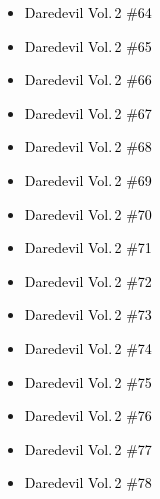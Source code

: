 \documentclass[12pt]{article}
\newcommand{\checkbox}{\raisebox{0.0ex}{\fbox{\rule{0ex}{1.5ex} \rule{1.5ex}{0ex}}}}
\begin{document}
\vspace{0.3cm}
\noindent
\begin{tcolorbox}[
  colback=white!95!gray,
  colframe=black,
  width=\textwidth,
  arc=4mm,
  auto outer arc,
  boxrule=0.8pt,
  left=8pt,right=8pt,top=8pt,bottom=8pt
]
\begin{itemize}[left=0pt,label={\checkbox}]
    \item \textcolor{black}{Daredevil Vol.\,2 \#64}
    \item \textcolor{black}{Daredevil Vol.\,2 \#65}
    \item \textcolor{black}{Daredevil Vol.\,2 \#66}
    \item \textcolor{black}{Daredevil Vol.\,2 \#67}
    \item \textcolor{black}{Daredevil Vol.\,2 \#68}
    \item \textcolor{black}{Daredevil Vol.\,2 \#69}
    \item \textcolor{black}{Daredevil Vol.\,2 \#70}
    \item \textcolor{black}{Daredevil Vol.\,2 \#71}
    \item \textcolor{black}{Daredevil Vol.\,2 \#72}
    \item \textcolor{black}{Daredevil Vol.\,2 \#73}
    \item \textcolor{black}{Daredevil Vol.\,2 \#74}
    \item \textcolor{black}{Daredevil Vol.\,2 \#75}
    \item \textcolor{black}{Daredevil Vol.\,2 \#76}
    \item \textcolor{black}{Daredevil Vol.\,2 \#77}
    \item \textcolor{black}{Daredevil Vol.\,2 \#78}
\end{itemize}
\end{tcolorbox}

\newpage
{}
\end{document}
